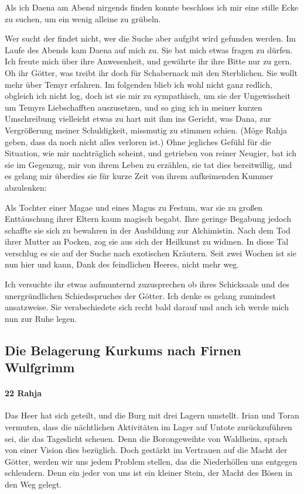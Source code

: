 Als ich Daena am Abend nirgends finden konnte beschloss ich mir eine stille Ecke zu suchen, um ein wenig alleine zu grübeln.

Wer sucht der findet nicht, wer die Suche aber aufgibt wird gefunden werden. Im Laufe des Abends kam Daena auf mich zu. Sie bat mich etwas fragen zu dürfen. Ich freute mich über ihre Anwesenheit, und gewährte ihr ihre Bitte nur zu gern. Oh ihr Götter, was treibt ihr doch für Schabernack mit den Sterblichen. Sie wollt mehr über Temyr erfahren. Im folgenden blieb ich wohl nicht ganz redlich, obgleich ich nicht log, doch ist sie mir zu sympathisch, um sie der Ungewissheit um Temyrs Liebschafften auszusetzen, und so ging ich in meiner kurzen Umschreibung vielleicht etwas zu hart mit ihm ins Gericht, was Dana, zur Vergrößerung meiner Schuldigkeit, missmutig zu stimmen schien. (Möge Rahja geben, dass da noch nicht alles verloren ist.) Ohne jegliches Gefühl für die Situation, wie mir nachträglich scheint, und getrieben von reiner Neugier, bat ich sie im Gegenzug, mir von ihrem Leben zu erzählen, sie tat dies bereitwillig, und es gelang mir überdies sie für kurze Zeit von ihrem aufkeimenden Kummer abzulenken:

Als Tochter einer Magae und eines Magus zu Festum, war sie zu großen Enttäuschung ihrer Eltern kaum magisch begabt. Ihre geringe Begabung jedoch schaffte sie sich zu bewahren in der Ausbildung zur Alchimistin. Nach dem Tod ihrer Mutter an Pocken, zog sie aus sich der Heilkunst zu widmen. In diese Tal verschlug es sie auf der Suche nach exotischen Kräutern. Seit zwei Wochen ist sie nun hier und kann, Dank des feindlichen Heeres, nicht mehr weg.

Ich versuchte ihr etwas aufmunternd zuzusprechen ob ihres Schicksaals und des unergründlichen Schiedsspruches der Götter. Ich denke es gelang zumindest ansatzweise. Sie verabschiedete sich recht bald darauf und auch ich werde mich nun zur Ruhe legen.

\subsection{Die Belagerung Kurkums nach Firnen Wulfgrimm}

\paragraph{22 Rahja}
Das Heer hat sich geteilt, und die Burg mit drei Lagern umstellt. Irian und Toran vermuten, dass die nächtlichen Aktivitäten im Lager auf Untote zurückzuführen sei, die das Tageslicht scheuen. Denn die Borongeweihte von Waldheim, sprach von einer Vision dies bezüglich. Doch gestärkt im Vertrauen auf die Macht der Götter, werden wir uns jedem Problem stellen, das die Niederhöllen uns entgegen schleudern. Denn ein jeder von uns ist ein kleiner Stein, der Macht des Bösen in den Weg gelegt.

